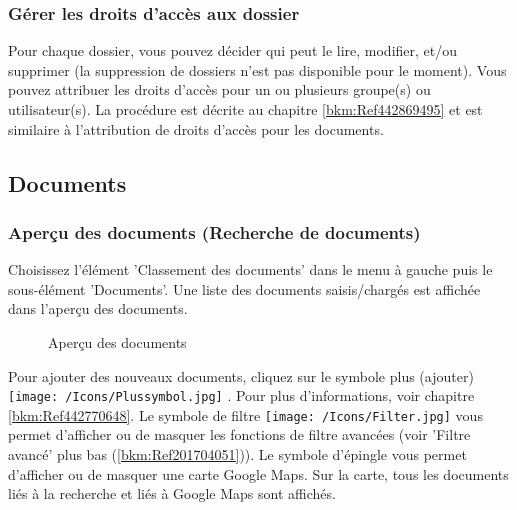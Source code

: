\vspace{5cm}

\subsubsection{Gérer les droits d'accès aux dossier}
\label{bkm:Ref442273510}
Pour chaque dossier, vous pouvez décider qui peut le lire, modifier, et/ou supprimer (la suppression de dossiers n'est pas disponible pour le moment). Vous pouvez attribuer les droits d'accès pour un ou plusieurs groupe(s) ou utilisateur(s). La procédure est décrite au chapitre \ref{bkm:Ref442869495} et est similaire à l'attribution de droits d'accès pour les documents.

\pagebreak
\subsection{Documents}
\label{bkm:Ref442273482}

\subsubsection{Aperçu des documents (Recherche de documents)}
\label{bkm:Ref443047823}

Choisissez l'élément 'Classement des documents' dans le menu à gauche puis le sous-élément 'Documents'. Une liste des documents saisis/chargés est affichée dans l'aperçu des documents.

\begin{figure}[H]
\caption{Aperçu des documents}
\end{figure}

Pour ajouter des nouveaux documents, cliquez sur le symbole plus (ajouter) \texttt{[image: /Icons/Plussymbol.jpg]} . Pour plus d'informations, voir chapitre \ref{bkm:Ref442770648}. Le symbole de filtre \texttt{[image: /Icons/Filter.jpg]}  vous permet d'afficher ou de masquer les fonctions de filtre avancées (voir 'Filtre avancé' plus bas (\ref{bkm:Ref201704051})). Le symbole d'épingle  vous permet d'afficher ou de masquer une carte Google Maps. Sur la carte, tous les documents liés à la recherche et liés à Google Maps sont affichés. \newline

